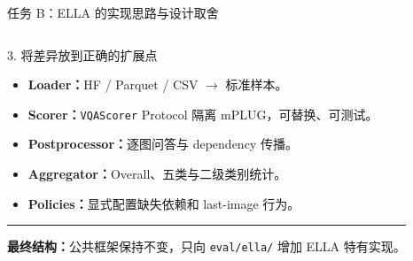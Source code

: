 \documentclass[aspectratio=169,10pt]{beamer}
\begin{document}
\begin{frame}{任务 B：ELLA 的实现思路与设计取舍}
\begin{columns}[T,onlytextwidth]
      \begin{block}{3. 将差异放到正确的扩展点}
        \begin{minipage}[c][5.05cm][c]{\linewidth}
          \begin{itemize}\scriptsize
            \item \textbf{Loader：}HF / Parquet / CSV $\to$ 标准样本。
            \item \textbf{Scorer：}\texttt{VQAScorer} Protocol 隔离 mPLUG，可替换、可测试。
            \item \textbf{Postprocessor：}逐图问答与 dependency 传播。
            \item \textbf{Aggregator：}Overall、五类与二级类别统计。
            \item \textbf{Policies：}显式配置缺失依赖和 last-image 行为。
          \end{itemize}
          \vspace{0.45em}
          \color{T2IGray}\rule{\linewidth}{0.35pt}\par\vspace{0.3em}
          \scriptsize\textbf{最终结构：}公共框架保持不变，只向 \texttt{eval/ella/} 增加 ELLA 特有实现。
        \end{minipage}
      \end{block}
  \end{columns}
\end{frame}
\end{document}
